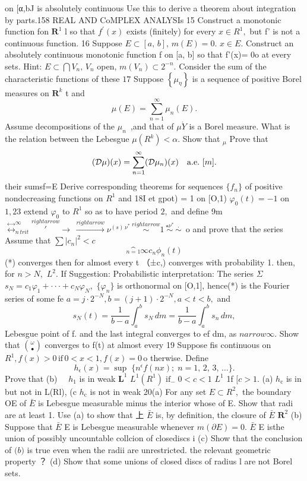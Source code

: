 on [α,bJ is absolutely continuous Use this to derive a theorem about integration by parts.158 REAL AND CoMPLEX ANALYSIs 15 Construct a monotonic function fon ${\boldsymbol{R}}^{1}$ l so that $f^{\prime}(x)$ exists (finitely) for every $x\in R^{1},$ but f' is not a continuous function. 16 Suppose $E\subset[a,\,b],\,m(E)=0.$ $x\in E.$ Construct an absolutely continuous monotonic function f on [a, b] so that f'(x)= 0o at every sets. Hint: $E\subset\bigcap V_{n},\,V_{n}$ open, $m(V_{n})\subset2^{-n}.$ Consider the sum of the characteristic functions of these $17$ Suppose $\left\{\mu_{\eta}\right\}$ is a sequence of positive Borel measures on ${\boldsymbol{R}}^{k}$ t and $$ \mu(E)=\sum_{n=1}^{\infty}\mu_{n}(E). $$ Assume decompositions of the $\mu_{n}\,$ ,and that of $\mu{\dot{Y}}$ is a Borel measure. What is the relation between the Lebesgue $\mu(R^{k})<\alpha.$ Show that ${}_{\!\mu}$ Prove that $$ ({\cal D}\mu)(x)=\sum_{n=1}^{\infty}({\cal D}\mu_{n})(x)\quad{\mathrm{a.e.~}}[m]. $$ their sumsf=E Derive corresponding theorems for sequences $\{f_{n}\}$ of positive nondecreasing functions on $R^{1}$ and 18I et gpot) = 1 on [O,1) $\varphi_{0}(t)=-1$ on $\scriptstyle{1,23}$ extend $\varphi_{0}$ to $R^{1}$ so as to have period $2,$ and define 9m $\stackrel{\leftrightarrow}{\leftrightarrow}_{n\,t r i t}^{\infty}\stackrel{ rightarrow}{\prime}\!\!\!\!\rightarrow\,\stackrel{ rightarrow}{\rightarrow}\nu^{(s)\,\nu^{*}}\,\stackrel{ rightarrow}{\sim}1\,{\stackrel{\star\nu^{*}}{\sim}}\,{\stackrel{.}{\sim}}\,$ o and prove that the series Assume that $\textstyle\sum|c_{n}|^{2}<c$ $$ {\underset{n=1}^{\infty}{c_{n}}}\phi_{n}(t) $$ (*) converges then for almost every t （±c,) converges with probability 1. then, for $n>N,$ $L^{2}.$ If Suggestion: Probabilistic interpretation: The series $\Sigma_{}^{}$ $s_{N}=c_{1}\varphi_{1}+\cdot\cdot\cdot+c_{N}\varphi_{N},$ $\{\varphi_{n}\}$ is orthonormal on [O,1], hence(*) is the Fourier series of some fe $a=j\cdot2^{-N},b=(j+1)\cdot2^{-N},a<t<b,$ and $$ s_{N}(t)=\frac{1}{b-a}\int_{a}^{b}s_{N}\,d m=\frac{1}{b-a}\int_{a}^{b}s_{n}\,d m, $$ Lebesgue point of f. and the last integral converges to ef dm, as $n arrow\infty.$ Show that $\scriptstyle{\binom{\omega}{\bullet}}$ converges to f(t) at almost every 19 Suppose fis continuous on $R^{1},f(x)>0\,\mathrm{if}\,0<x<1,f(x)=0\,\mathrm{o}$ therwise. Define $$ h_{\epsilon}(x)=\operatorname*{sup}\;\{n^{\epsilon}f(n x);\;n=1,\,2,\,3,\,\ldots\}. $$ Prove that (b) $\quad h_{1}$ is in weak ${\boldsymbol{L}}^{1}$ $L^{1}(R^{1})\operatorname{if}_{-}0<c<1$ $L^{1}$ 1f $[c>1.$ (a) $h_{\mathrm{{c}}}$ is in but not in L(Rl), (c $h_{\mathrm{{c}}}$ is not in weak 20(a) For any set $E\subset R^{2},$ the boundary OE of $\bar{E}$ is Lebesgue measurable minus the interior whose of E. Show that radi are at least 1. Use (a) to show that 上 $\bar{E}$ is, by definition, the closure of $\bar{E}$ ${\boldsymbol{R}}^{2}$ (b) Suppose that $\bar{E}$ E is Lebesgue measurable whenever $m(\partial E)=0.$ $\bar{E}$ E isthe union of possibly uncountable collcion of closediscs i (c) Show that the conclusion of ${\mathfrak{(}}b{\mathfrak{)}}$ is true even when the radii are unrestricted. the relevant geometric property ？ (d) Show that some unions of closed discs of radius l are not Borel sets. 